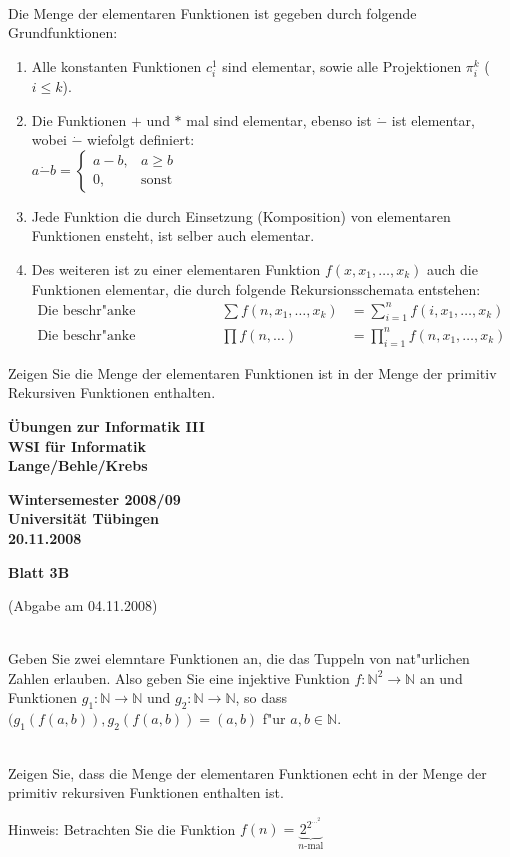 \documentclass[a4paper]{article}
\def\header#1#2#3{\pagestyle{empty}
\noindent
\begin{minipage}[t]{0.6\textwidth}
\begin{flushleft}
\bf \"Ubungen zur Informatik III\\
WSI f\"ur Informatik\\
Lange/Behle/Krebs
\end{flushleft}
\end{minipage}
\begin{minipage}[t]{0.4\textwidth}
\begin{flushright}
\bf Wintersemester 2008/09\\
Universit\"at T\"ubingen\\
#2 %
\end{flushright}
\end{minipage}

\begin{center}
{\Large\bf Blatt #1}

{(Abgabe am #3)}
\end{center}
}
\begin{document}
\bigskip
{}\\
Die Menge der elementaren Funktionen ist gegeben durch folgende Grundfunktionen:
\begin{enumerate}
\item Alle konstanten Funktionen $c^1_i$ sind elementar, sowie alle Projektionen $\pi^k_i$ ($i\leq k$).
\item Die Funktionen $+$ und $*$ mal sind elementar, ebenso ist $\dot-$ ist elementar, wobei $\dot-$ wiefolgt definiert:\\
$a\dot-b=\left\{
\begin{array}{ll}
a-b,&a\geq b\\
0,&\mbox{sonst}
\end{array}\right.$
\item Jede Funktion die durch Einsetzung (Komposition) von elementaren Funktionen ensteht, ist selber auch elementar.
\item Des weiteren ist zu einer elementaren Funktion $f(x,x_1,\ldots,x_k)$ auch die Funktionen elementar, die durch folgende Rekursionsschemata entstehen:\\
$\begin{array}{lll}
\mbox{Die beschr"anke Summation:} &\sum f(n,x_1,\ldots,x_k)&=\sum_{i=1}^n f(i,x_1,\ldots,x_k)\\
\mbox{Die beschr"anke Multiplikation:} &\prod f(n,\ldots)&=\prod_{i=1}^n f(n,x_1,\ldots,x_k)
\end{array}$
\end{enumerate}

Zeigen Sie die Menge der elementaren Funktionen ist in der Menge der primitiv Rekursiven Funktionen enthalten.

\newpage
\header{3B}{20.11.2008}{04.11.2008}

 \smallskip\\
Geben Sie zwei elemntare Funktionen an, die das Tuppeln von nat"urlichen Zahlen erlauben.
Also geben Sie eine injektive Funktion $f:\mathbb{N}^2\rightarrow\mathbb{N}$ an und Funktionen $g_1:\mathbb{N}\rightarrow\mathbb{N}$ und $g_2:\mathbb{N}\rightarrow\mathbb{N}$, so dass $(g_1(f(a,b)),g_2(f(a,b))=(a,b)$ f"ur $a,b\in\mathbb{N}$.


\bigskip
{} \smallskip\\
Zeigen Sie, dass die Menge der elementaren Funktionen echt in der Menge der primitiv rekursiven Funktionen enthalten ist.

Hinweis: Betrachten Sie die Funktion $f(n)=\underbrace{2^{2^{\dots^2}}}_{n\mbox{-mal}}$
\end{document}
